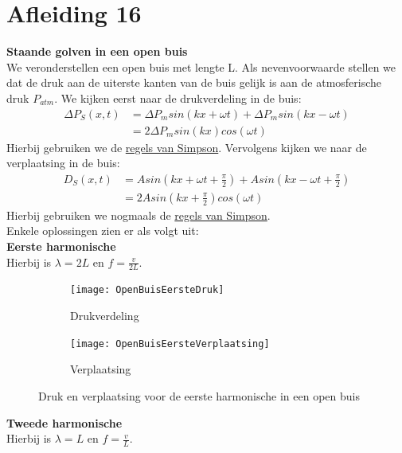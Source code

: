 \documentclass[a4paper,kul]{kulakarticle} %
\begin{document}
\section{Afleiding 16}
\textbf{Staande golven in een open buis}\\
We veronderstellen een open buis met lengte L. Als nevenvoorwaarde stellen we dat de druk aan de uiterste kanten van de buis gelijk is aan de atmosferische druk $P_{atm}$. We kijken eerst naar de drukverdeling in de buis:
\begin{align*}
	\Delta P_S (x,t) &= \Delta P_m sin(kx+\omega t) + \Delta P_m sin(kx-\omega t)\\
	&= 2\Delta P_m sin(kx)cos(\omega t)
\end{align*}
Hierbij gebruiken we de \href{https://nl.wikipedia.org/wiki/Lijst_van_goniometrische_gelijkheden#Som-naar-product-identiteiten_(regels_van_Simpson)}{regels van Simpson}. Vervolgens kijken we naar de verplaatsing in de buis:
\begin{align*}
	D_S(x,t)&=Asin(kx+\omega t+\frac{\pi}{2})+Asin(kx-\omega t+\frac{\pi}{2})\\
	&= 2Asin(kx+\frac{\pi}{2})cos(\omega t)
\end{align*}
Hierbij gebruiken we nogmaals de \href{https://nl.wikipedia.org/wiki/Lijst_van_goniometrische_gelijkheden#Som-naar-product-identiteiten_(regels_van_Simpson)}{regels van Simpson}.\\
Enkele oplossingen zien er als volgt uit:\\

\textbf{Eerste harmonische}\\
Hierbij is $\lambda = 2L$ en $f=\frac{v}{2L}$.

\begin{figure}[h]
	\centering
	\begin{subfigure}{.5\textwidth}
		\centering
		\texttt{[image: OpenBuisEersteDruk]}
		\caption{Drukverdeling}
		\label{fig:EersteBuisDruk}
	\end{subfigure}%
	\begin{subfigure}{.5\textwidth}
		\centering
		\texttt{[image: OpenBuisEersteVerplaatsing]}
		\caption{Verplaatsing}
		\label{fig:EersteBuisVerplaatsing}
	\end{subfigure}
	\caption{Druk en verplaatsing voor de eerste harmonische in een open buis}
	\label{fig:OpenBuisEerste}
\end{figure}
\newpage
\textbf{Tweede harmonische}\\
Hierbij is $\lambda = L$ en $f=\frac{v}{L}$.
\end{document}
